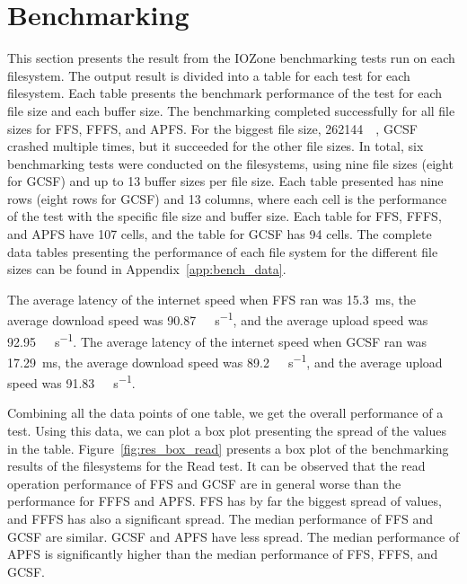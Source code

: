 \section{Benchmarking}
\label{sec:res_bench}
This section presents the result from the IOZone benchmarking tests run on each filesystem. The output result is divided into a table for each test for each filesystem. Each table presents the benchmark performance of the test for each file size and each buffer size. The benchmarking completed successfully for all file sizes for \gls{FFS}, \gls{FFFS}, and \gls{APFS}. For the biggest file size, \SI{262144}{\kilo\byte}, \gls{GCSF} crashed multiple times, but it succeeded for the other file sizes. In total, six benchmarking tests were conducted on the filesystems, using nine file sizes (eight for \gls{GCSF}) and up to 13 buffer sizes per file size. Each table presented has nine rows (eight rows for \gls{GCSF}) and 13 columns, where each cell is the performance of the test with the specific file size and buffer size. Each table for \gls{FFS}, \gls{FFFS}, and \gls{APFS} have 107 cells, and the table for \gls{GCSF} has 94 cells. The complete data tables presenting the performance of each file system for the different file sizes can be found in Appendix~\ref{app:bench_data}.

The average latency of the internet speed when \gls{FFS} ran was \SI{15.3}{\milli\second}, the average download speed was \SI[per-mode = symbol]{90.87}{\mega\bit\per\second}, and the average upload speed was \SI[per-mode = symbol]{92.95}{\mega\bit\per\second}. The average latency of the internet speed when \gls{GCSF} ran was \SI{17.29}{\milli\second}, the average download speed was \SI[per-mode = symbol]{89.2}{\mega\bit\per\second}, and the average upload speed was \SI[per-mode = symbol]{91.83}{\mega\bit\per\second}.

Combining all the data points of one table, we get the overall performance of a test. Using this data, we can plot a box plot presenting the spread of the values in the table. Figure~\ref{fig:res_box_read} presents a box plot of the benchmarking results of the filesystems for the Read test. It can be observed that the read operation performance of \gls{FFS} and \gls{GCSF} are in general worse than the performance for \gls{FFFS} and \gls{APFS}. \gls{FFS} has by far the biggest spread of values, and \gls{FFFS} has also a significant spread. The median performance of \gls{FFS} and \gls{GCSF} are similar. \gls{GCSF} and \gls{APFS} have less spread. The median performance of \gls{APFS} is significantly higher than the median performance of \gls{FFS}, \gls{FFFS}, and \gls{GCSF}. 

